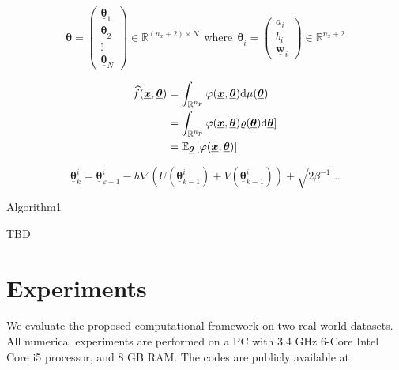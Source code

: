 \documentclass{article}
\newcommand{\differential}{{\rm{d}}}
\newcommand{\bx}{{\bm{x}}}
\begin{document}
  $$\underline{\bm{\bm{\theta}}}=\begin{pmatrix} \underline{\bm{\bm{\theta}}}_{1}\\ \underline{\bm{\bm{\theta}}}_{2}\\ 
 \vdots\\
 \underline{\bm{\bm{\theta}}}_{N}\end{pmatrix} \in \mathbb{R}^{(n_{x}+2)\times N}~~ \text{where}~~  \underline{\bm{\bm{\theta}}}_{i}=\begin{pmatrix} a_{i}\\ b_{i}\\ \underline{\bm{w}}_i\end{pmatrix} \in \mathbb{R}^{n_{x}+2}
$$
 
\begin{subequations}
\begin{align}
 \widehat{f}(\underline{\bx},\underline{\bm{\bm{\theta}}})&=\int_{\mathbb{R}^{n_p}} \varphi(\underline{\bx},\underline{\bm{\bm{\theta}}}) \differential \mu (\underline{\bm{\bm{\theta}}}) \\
    & =\int_{\mathbb{R}^{n_p}} \varphi(\underline{\bx},\underline{\bm{\bm{\theta}}}) \varrho(\underline{\bm{\bm{\theta}}}) \differential \underline{\bm{\bm{\theta}}}] \label{f_hat_weight} \\  
      &= \mathbb{E}_{\underline{\bm{\bm{\theta}}}} \left[ \varphi(\underline{\bx},\underline{\bm{\bm{\theta}}})\right] \label{f_hat_average}
\end{align}
\label{f_hat}
\end{subequations}

\begin{equation}
    \underline{\bm{\theta}}_{k}^{i}=\underline{\bm{\theta}}_{k-1}^{i}-h \nabla \left( U(\underline{\bm{\theta}}_{k-1}^{i})+V (\underline{\bm{\theta}}_{k-1}^{i}) \right)+\sqrt{2 \beta^{-1}}...
    \label{EulerMaruyama}
\end{equation}


\begin{algorithm}
\caption{Algorithm1}\label{alg1}
TBD
\end{algorithm}


\section{Experiments}
\label{Experiments}
We evaluate the proposed computational framework on two real-world datasets. All numerical experiments are performed on a PC with 3.4 GHz  6-Core Intel Core i5 processor, and 8 GB RAM. The codes are publicly available at
\end{document}
